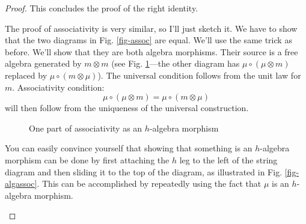 \documentclass[letterpaper, 10 pt, conference]{ieeeconf}
\begin{document}
\begin{proof}
This concludes the proof of the right identity.

The proof of associativity is very similar, so I'll just sketch it. We have to show that the two diagrams in Fig. \ref{fig-assoc} are equal. We'll use the same trick as before. We'll show that they are both algebra morphisms. Their source is a free algebra generated by $m \otimes m$ (see Fig. \ref{fig-monassoc}---the other diagram has $\mu \circ (\mu \otimes m)$ replaced by $\mu \circ (m \otimes \mu)$). The universal condition follows from the unit law for $m$. Associativity condition:
\[\mu \circ (\mu \otimes m) = \mu \circ (m \otimes \mu)\]
will then follow from the uniqueness of the universal construction.
\begin{figure}[H]
\centering
{}
\caption{One part of associativity as an $h$-algebra morphism}
\label{fig-monassoc}
\end{figure}

You can easily convince yourself that showing that something is an $h$-algebra morphism can be done by first attaching the $h$ leg to the left of the string diagram and then sliding it to the top of the diagram, as illustrated in Fig. \ref{fig-algassoc}. This can be accomplished by repeatedly using the fact that $\mu$ is an $h$-algebra morphism.

\begin{figure}[H]
\centering
{}
\end{figure}
\end{proof}
\end{document}

